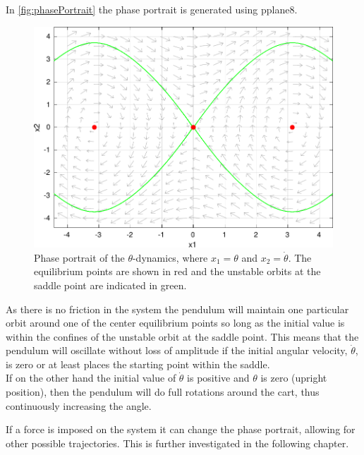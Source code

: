 In \autoref{fig:phasePortrait} the phase portrait is generated using pplane8.

\begin{figure}[H]
  \includegraphics[width=.8\textwidth]{figures/systemPhasePortrait}
  \caption{Phase portrait of the $\theta$-dynamics, where $x_1 = \theta$ and $x_2 = \dot{\theta}$. The equilibrium points are shown in red and the unstable orbits at the saddle point are indicated in green.}
  \label{fig:phasePortrait}
\end{figure}

As there is no friction in the system the pendulum will maintain one particular orbit around one of the center equilibrium points so long as the initial value is within the confines of the unstable orbit at the saddle point. This means that the pendulum will oscillate without loss of amplitude if the initial angular velocity, $\dot{\theta}$, is zero or at least places the starting point within the saddle.\\
If on the other hand the initial value of $\dot{\theta}$ is positive and $\theta$ is zero (upright position), then the pendulum will do full rotations around the cart, thus continuously increasing the angle.

If a force is imposed on the system it can change the phase portrait, allowing for other possible trajectories. This is further investigated in the following chapter.
